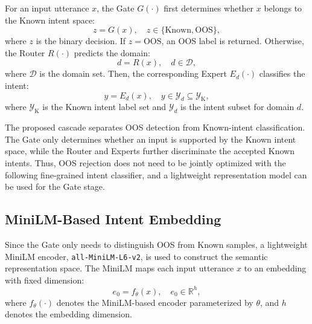 \documentclass[11pt]{article}
\begin{document}
For an input utterance $x$, the Gate $G(\cdot)$ first determines whether $x$ belongs to the Known intent space:
\begin{equation}
z=G(x),\quad z\in\{\mathrm{Known},\mathrm{OOS}\},
\end{equation}
where $z$ is the binary decision. If $z=\mathrm{OOS}$, an OOS label is returned. Otherwise, the Router $R(\cdot)$ predicts the domain:
\begin{equation}
d=R(x),\quad d\in\mathcal{D},
\end{equation}
where $\mathcal{D}$ is the domain set. Then, the corresponding Expert $E_d(\cdot)$ classifies the intent:
\begin{equation}
y=E_d(x),\quad y\in\mathcal{Y}_d\subseteq\mathcal{Y}_{\mathrm{K}},
\end{equation}
where $\mathcal{Y}_{\mathrm{K}}$ is the Known intent label set and $\mathcal{Y}_d$ is the intent subset for domain $d$.

The proposed cascade separates OOS detection from Known-intent classification. The Gate only determines whether an input is supported by the Known intent space, while the Router and Experts further discriminate the accepted Known intents. Thus, OOS rejection does not need to be jointly optimized with the following fine-grained intent classifier, and a lightweight representation model can be used for the Gate stage.

\subsection{MiniLM-Based Intent Embedding}

Since the Gate only needs to distinguish OOS from Known samples, a lightweight MiniLM encoder, \texttt{all-MiniLM-L6-v2}, is used to construct the semantic representation space. The MiniLM maps each input utterance $x$ to an embedding with fixed dimension:
\begin{equation}
e_0=f_{\theta}(x),\quad e_0\in\mathbb{R}^{h},
\label{eq:embed}
\end{equation}
where $f_{\theta}(\cdot)$ denotes the MiniLM-based encoder parameterized by $\theta$, and $h$ denotes the embedding dimension.
\end{document}
